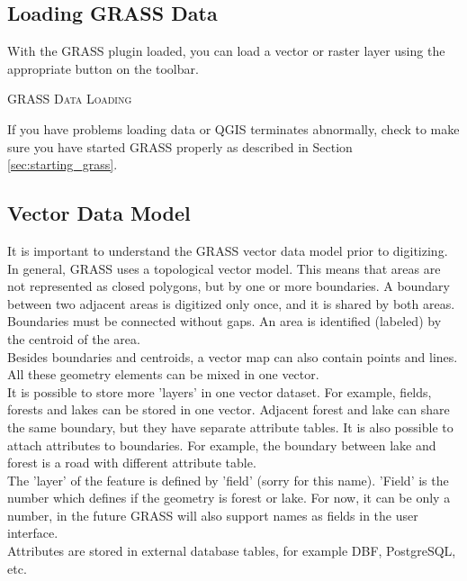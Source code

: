 \documentclass[10pt,english]{article}
\newcommand\qgistip[1]{\raggedright\small{#1}}
\begin{document}
\begin{onehalfspace}
\subsection{Loading GRASS Data}
With the GRASS plugin loaded, you can load a vector or raster layer using the appropriate button on the toolbar. \begin{Tip}\caption{\textsc{GRASS Data Loading}}
\qgistip{If you have problems loading data or QGIS terminates abnormally, check to make sure you have started GRASS properly as described in Section \ref{sec:starting_grass}.
}
\end{Tip} 
\subsection{Vector Data Model}
It is important to understand the GRASS vector data model prior to
digitizing.
In general, GRASS uses a topological vector model. This
means that areas are not represented as closed polygons, but by one or more
boundaries. A boundary between two adjacent areas is digitized only once, and it
is shared by both areas. Boundaries must be connected without gaps. An area is
identified (labeled) by the centroid of the area.\\

Besides boundaries and centroids, a vector map can also contain
points and lines. All these geometry elements can be mixed
in one vector.\\

It is possible to store more 'layers' in one vector dataset. For example,
fields, forests and lakes can be stored in one vector. Adjacent
forest and lake can share the same boundary, but they have separate attribute tables.
It is also possible to attach attributes to boundaries. For example, the boundary between lake and forest is a road with different attribute table.\\

The 'layer' of the feature is defined by 'field' (sorry for this name).
'Field' is the number which defines if the geometry is forest or lake.
For now, it can be only a number, in the future GRASS will also support  
names as fields in the user interface.\\

Attributes are stored in external database tables, for example
DBF, PostgreSQL, etc.\\


\end{onehalfspace}
\end{document}
